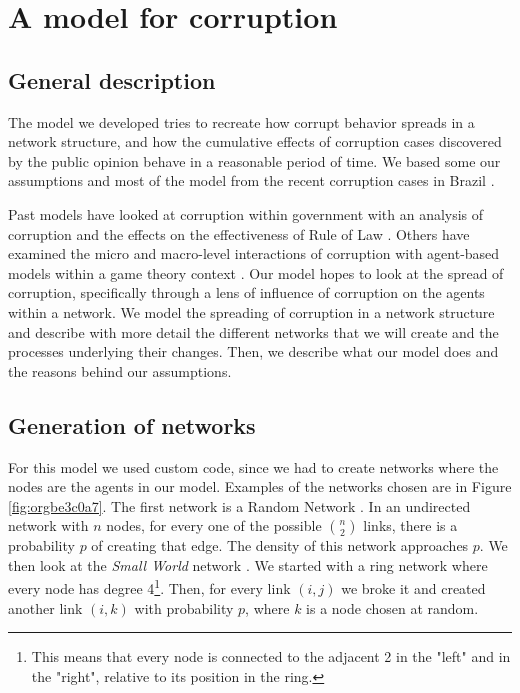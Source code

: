 \documentclass[letterpaper, 11pt]{article}
\begin{document}
\section{A model for corruption}
\label{sec:orgeda23d5}

\subsection{General description}
\label{sec:org657365d}
The model we developed tries to recreate how corrupt behavior spreads in a network structure, and how the cumulative effects of corruption cases discovered by the public
opinion behave in a reasonable period of time. We based some our assumptions and most of the model from the recent corruption cases in Brazil \citep{garay18}.

Past models have looked at corruption within government with an analysis of corruption and the effects on the effectiveness of Rule of Law \citep{guerrero2019}. Others have examined the micro and macro-level interactions of corruption with agent-based models within a game theory context \citep{hammond2000}. Our model hopes to look at the spread of corruption, specifically through a lens of influence of corruption on the agents within a network. We model the spreading of corruption in a network structure and describe with more detail the different networks that we will create and the processes underlying their changes. Then, we describe what our model does and the reasons behind our assumptions.

\subsection{Generation of networks}
\label{sec:orgb2ce29b}
For this model we used custom code, since we had to create networks where the nodes are the agents in our model. Examples of the networks chosen are in Figure \ref{fig:orgbe3c0a7}. The first network is a Random Network \citep{gilbert1959}. In an undirected network with \(n\) nodes, for every one of the possible \(\binom{n}{2}\) links, there is a probability \(p\) of creating that edge. The density of this network approaches \(p\). We then look at the \emph{Small World} network \citep{watts1998}. We started with a ring network where every node has degree 4\footnote{This means that every node is connected to the adjacent 2 in the "left" and in the "right", relative to its position in the ring.}. Then, for every link \((i, j)\) we broke it and created another link \((i, k)\) with probability \(p\), where \(k\) is a node chosen at random.
\end{document}
